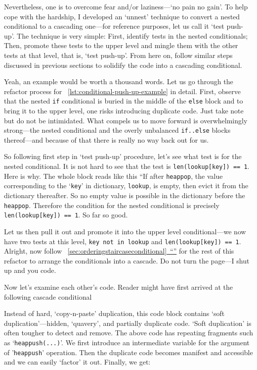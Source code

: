 \documentclass[oneside,11pt]{book}
\theoremstyle{definition}
\theoremstyle{remark}
\newcommand{\code}[1]{\mbox{\lstinline{#1}}}
\newcommand*{\fullref}[1]{\hyperref[{#1}]{\mbox{\autoref*{#1}~}``\nameref*{#1}''}}
\begin{document}
Nevertheless, one is to overcome fear and/or laziness---`no pain no gain'.
To help cope with the hardship, I developed an `unnest' technique to convert a nested conditional
to a cascading one---for reference purposes, let us call it `test push-up'.
The technique is very simple:
First, identify tests in the nested conditionals;
Then, promote these tests to the upper level and mingle them with the other tests at that level,
that is, `test push-up'.
From here on, follow similar steps discussed in previous sections to solidify the code into a
cascading conditional.


Yeah, an example would be worth a thousand words.
Let us go through the refactor process for ~\autoref{lst:conditional-push-up-example} in detail.
First, observe that the nested \code{if} conditional is
buried in the middle of the \code{else} block and to bring it to the upper level, one risks
introducing duplicate code.
Just take note but do not be intimidated.
What compels us to move forward is overwhelmingly
strong---the nested conditional and the overly unbalanced \code{if..else} blocks thereof---and
because of that there is really no way back out for us.


So following first step in `test push-up' procedure, let's see what test is for the nested conditional.
It is not hard to see that the test is \code{len(lookup[key]) == 1}.
Here is why.
The whole block reads like this ``If after \code{heappop}, the value corresponding to the
`\code{key}' in dictionary, \code{lookup}, is empty, then evict it from the dictionary thereafter.
So no empty value is possible in the dictionary before the \code{heappop}.
Therefore the condition for the nested conditional is precisely \code{len(lookup[key]) == 1}.
So far so good.

Let us then pull it out and promote it into the upper level conditional---we now have two tests
at this level, \code{key not in lookup} and \code{len(lookup[key]) == 1}.
Alright, now follow ~\fullref{sec:orderingstaircaseconditional}
for the rest of this refactor to arrange the conditionals into a cascade.
Do not turn the page---I shut up and you code.


\clearpage
Now let's examine each other's code.
Reader might have first arrived at the following cascade conditional


Instead of hard, `copy-n-paste' duplication, this code block contains `soft
duplication'---hidden, `quavery', and partially duplicate code.
`Soft duplication' is often tougher to detect and remove.
The above code has repeating fragments such as `\code{heappush(...)}'.
We first introduce an intermediate variable for the argument of '\code{heappush}' operation.
Then the duplicate code becomes manifest and accessible and we can easily `factor' it out.
Finally, we get:

\end{document}
